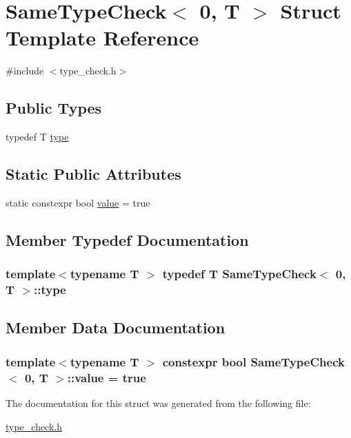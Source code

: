 \hypertarget{struct_same_type_check_3_010_00_01_t_01_4}{\section{Same\-Type\-Check$<$ 0, T $>$ Struct Template Reference}
\label{struct_same_type_check_3_010_00_01_t_01_4}
}


{\ttfamily \#include $<$type\-\_\-check.\-h$>$}

\subsection*{Public Types}
\begin{DoxyCompactItemize}
\item 
typedef T \hyperlink{struct_same_type_check_3_010_00_01_t_01_4_afc0f35b366f82eb7f0051a7de6c9070f}{type}
\end{DoxyCompactItemize}
\subsection*{Static Public Attributes}
\begin{DoxyCompactItemize}
\item 
static constexpr bool \hyperlink{struct_same_type_check_3_010_00_01_t_01_4_a0faa450f2776529e025404d2d16c0e7e}{value} = true
\end{DoxyCompactItemize}


\subsection{Member Typedef Documentation}
\hypertarget{struct_same_type_check_3_010_00_01_t_01_4_afc0f35b366f82eb7f0051a7de6c9070f}{
\subsubsection[{type}]{\setlength{\rightskip}{0pt plus 5cm}template$<$typename T $>$ typedef T {\bf Same\-Type\-Check}$<$ 0, T $>$\-::{\bf type}}}\label{struct_same_type_check_3_010_00_01_t_01_4_afc0f35b366f82eb7f0051a7de6c9070f}


\subsection{Member Data Documentation}
\hypertarget{struct_same_type_check_3_010_00_01_t_01_4_a0faa450f2776529e025404d2d16c0e7e}{
\subsubsection[{value}]{\setlength{\rightskip}{0pt plus 5cm}template$<$typename T $>$ constexpr bool {\bf Same\-Type\-Check}$<$ 0, T $>$\-::value = true\hspace{0.3cm}{\ttfamily [static]}}}\label{struct_same_type_check_3_010_00_01_t_01_4_a0faa450f2776529e025404d2d16c0e7e}


The documentation for this struct was generated from the following file\-:\begin{DoxyCompactItemize}
\item 
\hyperlink{type__check_8h}{type\-\_\-check.\-h}\end{DoxyCompactItemize}

